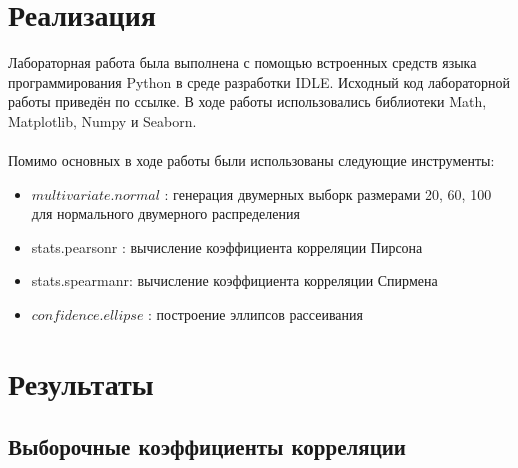 \section{Реализация}
Лабораторная работа была выполнена с помощью встроенных средств языка программирования Python в среде разработки IDLE. Исходный код лабораторной работы приведён по ссылке. В ходе работы использовались библиотеки Math, Matplotlib, Numpy и Seaborn. \\ \\
Помимо основных в ходе работы были использованы следующие инструменты:
\begin{itemize}
\item $multivariate.normal$ : генерация двумерных выборк размерами 20, 60, 100 для нормального двумерного распределения \cite{ellipse}
\item stats.pearsonr : вычисление коэффициента корреляции Пирсона
\item stats.spearmanr:  вычисление коэффициента корреляции Спирмена
\item $confidence.ellipse$ : построение эллипсов рассеивания
\end{itemize}

\section{Результаты}
\subsection{Выборочные коэффициенты корреляции}
